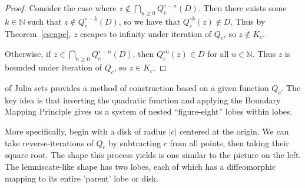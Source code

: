 \documentclass[symmetric]{tufte-handout}
\begin{document}
\begin{proof}
    Consider the case where
    $z\notin \bigcap_{n\ge 0} Q_c^{\circ -n} (D)$.
    Then there exists some $k\in \mathbb{N}$ such that $z\notin Q_c^{\circ -k} (D)$,
    so we have that $Q_c^{\circ k}(z) \notin D$. 
    Thus by Theorem~\ref{escape}, $z$ escapes to infinity under iteration
    of $Q_c$, so $z\notin K_c$.  

    Otherwise, if $z\in \bigcap_{n\ge 0} Q_c^{\circ -n} (D)$, then 
     $Q_c^{\circ n}(z) \in D$ for all $n\in \mathbb{N}$. Thus $z$ is bounded under
     iteration of $Q_c$, so $z\in K_c$.
\end{proof}

 of Julia sets provides a method of construction based on 
a given function $Q_c$. The key idea is that inverting the quadratic function and 
applying the Boundary Mapping Principle gives us a system of nested ``figure-eight''
lobes within lobes.

More specifically, begin with a disk of radius $|c|$ centered at the origin. We can take reverse-iterations of $Q_c$ by subtracting $c$ from all points, then taking their square root. The shape this process yields is one similar to the picture on the left. The lemniscate-like shape has two lobes, each of which has a diffeomorphic mapping to its entire 'parent' lobe or disk. 
\end{document}
